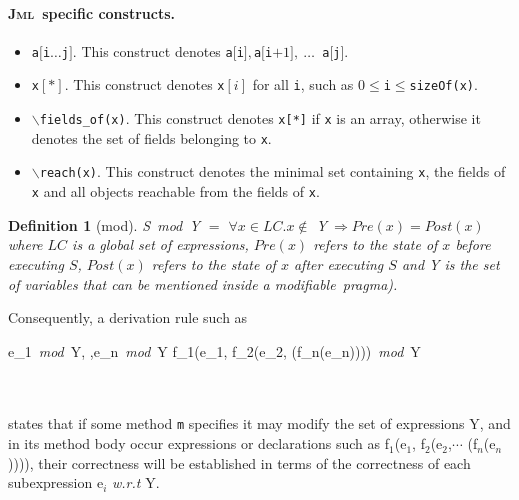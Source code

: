 \documentclass[a4paper]{llncs}
\newcommand{\jml}{\textsc{Jml}}
\newcommand{\modif}{\textit{modifiable}}
\newtheorem {df}{Definition}
\begin{document}
\paragraph{\bf \jml~specific constructs.}
\begin{itemize} %
\item{\texttt{a$[$i$\dots$j$]$}}. This construct denotes \texttt{a$[$i$],$a$[$i$+1],\
\dots$ a$[$j$]$}.
\item{\texttt{x$[*]$}}. This construct denotes \texttt{x$[i]$} for all
\texttt{i}, such as $0\leq$\texttt{i}$\le$\texttt{sizeOf(x)}.
\item{\texttt{$\backslash$fields\_of(x)}}. This construct denotes
\texttt{x[*]} if \texttt{x} is an array, otherwise it denotes the set
of fields belonging to \texttt{x}.
\item{\texttt{$\backslash$reach(x)}}. This construct denotes the
minimal set containing \texttt{x}, the fields of \texttt{x} and all
objects reachable from the fields of \texttt{x}.
\end{itemize} %
\begin{df}[mod] %
\label{df-mod}
\textup{S}\ \textit{mod}\ \textsc{Y} $=$ $\forall x \in LC.
x\not\in$ \textsc{Y}$\ \Rightarrow Pre(x) = Post(x)$ \\
where $LC$ is a global set of expressions, $Pre(x)$
refers to the state of $x$ before executing $S$,
$Post(x)$ refers to the state of $x$ after executing
$S$ and \textsc{Y} is the set of variables that can be mentioned
inside a \modif~pragma).
\end{df} %
Consequently, a derivation rule such as \\
\begin{prooftree}
\rule[1ex]{0em}{1.5ex}
\textup{e}_1\ \textit{mod}\ \textsc{Y}, \cdots ,\textup{e}_n\ \textit{mod}\ \textsc{Y}
\justifies
\textup{f}_1\textup{(e}_1\textup{, f}_2\textup{(e}_2\textup{,}\cdots
\textup{(f}_n\textup{(e}_n\textup{))))}\ \textit{mod}\ \textsc{Y} 
\end{prooftree}\\ \\
states that if some method \texttt{m} specifies it may modify the set
of expressions \textsc{Y}, and in its method body occur expressions or
declarations such as \textup{f}$_1$\textup{(e}$_1$\textup{,
f}$_2$\textup{(e}$_2$\textup{,}$\cdots$
\textup{(f}$_n$\textup{(e}$_n$\textup{))))}, their correctness will be
established in terms of the correctness of each subexpression
\textup{e}$_i$ \emph{w.r.t} \textsc{Y}. 
\end{document}
